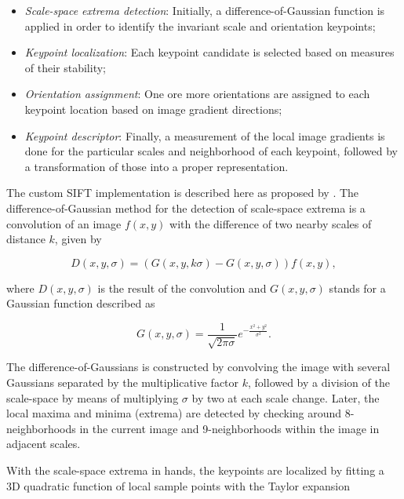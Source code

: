 \begin{itemize}
	\item \emph{Scale-space extrema detection}: Initially, a difference-of-Gaussian function is applied in order to identify the invariant scale and orientation keypoints;
    
    \item \emph{Keypoint localization}: Each keypoint candidate is selected based on measures of their stability;
    
    \item \emph{Orientation assignment}: One ore more orientations are assigned to each keypoint location based on image gradient directions;
    
    \item \emph{Keypoint descriptor}: Finally, a measurement of the local image gradients is done for the particular scales and neighborhood of each keypoint, followed by a    transformation of those into a proper representation.
	
\end{itemize}

The custom SIFT implementation is described here as proposed by . The difference-of-Gaussian method for the detection of scale-space extrema is a convolution of an image $f(x,y)$ with the difference of two nearby scales of distance $k$, given by

\begin{equation}
\label{eqn:DoG}
D(x,y,\sigma) = \left(G(x,y,k \sigma) - G(x,y,\sigma)\right) f(x,y),
\end{equation}

\noindent where $D(x,y,\sigma)$ is the result of the convolution and $G(x,y,\sigma)$ stands for a Gaussian function described as

\begin{equation}
\label{eqn:gaussian_function}
G(x,y,\sigma) = \frac{1}{\sqrt{2 \pi \sigma}} e^{- \frac{x^{2} + y^{2}}{\sigma^{2}}}.
\end{equation}

The difference-of-Gaussians is constructed by convolving the image with several Gaussians separated by the multiplicative factor $k$, followed by a division of the scale-space by means of multiplying $\sigma$ by two at each scale change. Later, the local maxima and minima (extrema) are detected by checking around 8-neighborhoods in the current image and 9-neighborhoods within the image in adjacent scales.

With the scale-space extrema in hands, the keypoints are localized by fitting a 3D quadratic function of local sample points with the Taylor expansion

